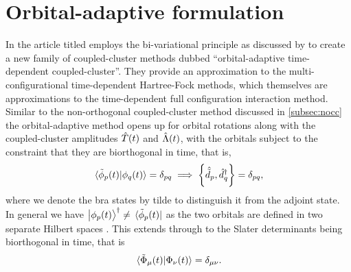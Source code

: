     \section{Orbital-adaptive formulation}
        \label{sec:oatdcc}
        In the article titled 
        \citeauthor{kvaal2012ab} \cite{kvaal2012ab} employs the
        bi-variational principle as discussed by \citeauthor{arponen1983311}
        \cite{arponen1983311} to create a new family of coupled-cluster
        methods dubbed ``orbital-adaptive time-dependent
        coupled-cluster''.
        They provide an approximation to the multi-configurational
        time-dependent Hartree-Fock methods, which themselves are
        approximations to the time-dependent full configuration interaction
        method.
        Similar to the non-orthogonal coupled-cluster method discussed in
        \autoref{subsec:nocc} the orbital-adaptive method opens up for
        orbital rotations along with the coupled-cluster amplitudes
        $\hat{T}(t)$ and $\hat{\Lambda}(t)$, with the orbitals subject to the
        constraint that they are biorthogonal in time, that is,
        \begin{align}
            \braket*{\tilde{\phi}_p(t)}{\phi_q(t)} = \delta_{pq}
            \implies
            \left\{\hat{\tilde{d}}_{p}, \hat{d}^{\dagger}_{q}\right\}
            = \delta_{pq},
        \end{align}
        where we denote the bra states by tilde to distinguish it from the
        adjoint state.
        In general we have $\ket{\phi_p(t)}^{\dagger} \neq
        \bra*{\tilde{\phi}_p(t)}$ as the two orbitals are defined in two
        separate Hilbert spaces \cite{kvaal2012ab}.
        This extends through to the Slater determinants being biorthogonal
        in time, that is
        \begin{align}
            \braket*{\tilde{\Phi}_{\mu}(t)}{\Phi_{\nu}(t)}
            = \delta_{\mu\nu}.
        \end{align}

